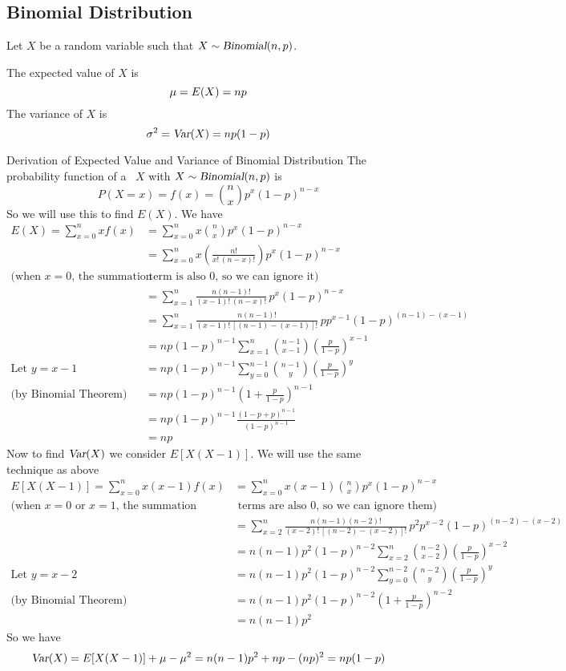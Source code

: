 \subsection*{Binomial Distribution}
Let $X$ be a random variable such that $X \sim \operatorname{\textsl{Binomial}}(n,p)$.
\par\medskip\noindent
The expected value of $X$ is
\[
    \mu = E(X) = np
\]
The variance of $X$ is
\[
    \sigma^2 = \operatorname{\textsl{Var}}(X) = np(1-p)
\]
\pagebreak[3]
\begin{theory}{Derivation of Expected Value and Variance of Binomial Distribution}
The probability function of a \rv~$X$ with $X \sim \operatorname{\textsl{Binomial}}(n,p)$ is
\[
    P(X = x) = f(x) = \binom{n}{x}p^x(1-p)^{n-x}
\]
So we will use this to find $E(X)$. We have
\begin{align*}
    E(X) = \sum_{x = 0}^{n} xf(x) 
    &= \sum_{x = 0}^{n} x \binom{n}{x}p^x(1-p)^{n-x} \\
    &= \sum_{x = 0}^{n} x\left(\frac{n!}{x!\,(n-x)!}\right) p^x (1-p)^{n-x} \\
    \text{(when $x = 0$, the summation}&\text{ term is also 0, so we can ignore it)} \\
    &= \sum_{x = 1}^{n} \frac{n(n-1)!}{(x-1)!\,(n-x)!}\,p^x (1-p)^{n-x} \\
    &= \sum_{x = 1}^{n} \frac{n(n-1)!}{(x-1)!\,[(n-1)-(x-1)]!} \,pp^{x-1} (1-p)^{(n-1)-(x-1)} \\
    &= np(1-p)^{n-1} \sum_{x = 1}^{n} \binom{n-1}{x-1} \left(\frac{p}{1-p}\right)^{x-1} \\
    \text{Let $y = x - 1$} \qquad
    &= np(1-p)^{n-1} \sum_{y = 0}^{n-1} \binom{n-1}{y} \left(\frac{p}{1-p}\right)^{y} \\
    \text{(by Binomial Theorem)} \qquad
    &= np(1-p)^{n-1} \left(1 + \frac{p}{1-p}\right)^{n-1} \\
    &= np (1-p)^{n-1} \frac{(1-p+p)^{n-1}}{(1-p)^{n-1}} \\
    &= np
\end{align*}
Now to find $\operatorname{\textsl{Var}}(X)$ we consider $E[X(X-1)]$. We will use the same technique as above
\begin{align*}
    E[X(X-1)] = \sum_{x = 0}^{n} x(x-1)f(x)
    &= \sum_{x = 0}^{n} x(x-1) \binom{n}{x}p^x(1-p)^{n-x} \\
    \text{(when $x = 0$ or $x = 1$, the summation}&\text{ terms are also 0, so we can ignore them)} \\
    &= \sum_{x = 2}^{n} \frac{n(n-1)(n-2)!}{(x-2)!\,[(n-2)-(x-2)]!} \,p^2p^{x-2} (1-p)^{(n-2)-(x-2)} \\
    &= n(n-1)p^2(1-p)^{n-2} \sum_{x = 2}^{n} \binom{n-2}{x-2} \left(\frac{p}{1-p}\right)^{x-2} \\
    \text{Let $y = x - 2$} \qquad
    &= n(n-1)p^2(1-p)^{n-2} \sum_{y = 0}^{n - 2} \binom{n-2}{y} \left(\frac{p}{1-p}\right)^{y} \\
    \text{(by Binomial Theorem)} \qquad &= n(n-1)p^2(1-p)^{n-2} \left(1 + \frac{p}{1-p}\right)^{n-2} \\
    &= n(n-1)p^2
\end{align*}
So we have
\[
    \operatorname{\textsl{Var}}(X) = E[X(X-1)] + \mu - \mu^2 = n(n-1)p^2 + np - (np)^2 = np(1-p)
\]
\end{theory}
